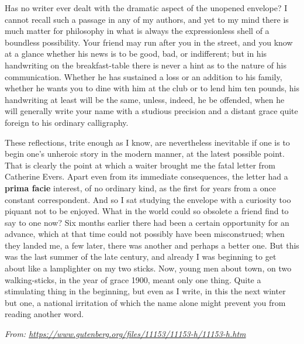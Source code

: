\begin{linenumbers*}
\modulolinenumbers[5] 
\indent Has no writer ever dealt with the dramatic aspect of the unopened envelope? I cannot recall such a passage in any of my authors, and yet to my mind there is much matter for philosophy in what is always the expressionless shell of a boundless possibility. Your friend may run after you in the street, and you know at a glance whether his news is to be good, bad, or indifferent; but in his handwriting on the breakfast-table there is never a hint as to the nature of his communication. Whether he has sustained a loss or an addition to his family, whether he wants you to dine with him at the club or to lend him ten pounds, his handwriting at least will be the same, unless, indeed, he be offended, when he will generally write your name with a studious precision and a distant grace quite foreign to his ordinary calligraphy.

\indent These reflections, trite enough as I know, are nevertheless inevitable if one is to begin one's unheroic story in the modern manner, at the latest possible point. That is clearly the point at which a waiter brought me the fatal letter from Catherine Evers. Apart even from its immediate consequences, the letter had a \textbf{prima facie} interest, of no ordinary kind, as the first for years from a once constant correspondent. And so I sat studying the envelope with a curiosity too piquant not to be enjoyed. What in the world could so obsolete a friend find to say to one now? Six months earlier there had been a certain opportunity for an advance, which at that time could not possibly have been misconstrued; when they landed me, a few later, there was another and perhaps a better one. But this was the last summer of the late century, and already I was beginning to get about like a lamplighter on my two sticks. Now, young men about town, on two walking-sticks, in the year of grace 1900, meant only one thing. Quite a stimulating thing in the beginning, but even as I write, in this the next winter but one, a national irritation of which the name alone might prevent you from reading another word.
\end{linenumbers*}

\textit{From: \url{https://www.gutenberg.org/files/11153/11153-h/11153-h.htm}}

